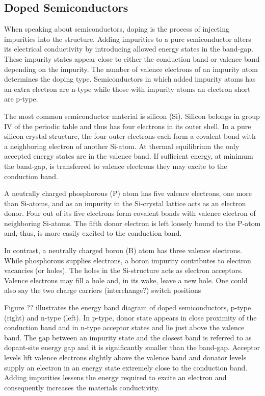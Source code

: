 \subsection{Doped Semiconductors}
When speaking about semiconductors, doping is the process of injecting impurities into the structure. Adding impurities to a pure semiconductor alters its electrical conductivity by introducing allowed energy states in the band-gap. These impurity states appear close to either the conduction band or valence band depending on the impurity. The number of valence electrons of an impurity atom determines the doping type. Semiconductors in which added impurity atoms has an extra electron are n-type while those with impurity atoms an electron short are p-type.

The most common semiconductor material is silicon (Si). Silicon belongs in group IV of the periodic table and thus has four electrons in its outer shell. In a pure silicon crystal structure, the four outer electrons each form a covalent bond with a neighboring electron of another Si-atom. At thermal equilibrium the only accepted energy states are in the valence band. If sufficient energy, at minimum the band-gap, is transferred to valence electrons they may excite to the conduction band.

A neutrally charged phosphorous (P) atom has five valence electrons, one more than Si-atoms, and as an impurity in the Si-crystal lattice acts as an electron donor. Four out of its five electrons form covalent bonds with valence electron of neighboring Si-atoms. The fifth donor electron is left loosely bound to the P-atom and, thus, is more easily excited to the conduction band.

In contrast, a neutrally charged boron (B) atom has three valence electrons. While phosphorous supplies electrons, a boron impurity contributes to electron vacancies (or holes). The holes in the Si-structure acts as electron acceptors. Valence electrons may fill a hole and, in its wake, leave a new hole. One could also say the two charge carriers (interchange?) switch positions

Figure ?? illustrates the energy band diagram of doped semiconductors, p-type (right) and n-type (left).
In p-type, donor state appears in close proximity of the conduction band and in n-type acceptor states and lie just above the valence band. The gap between an impurity state and the closest band is referred to as dopant-site energy gap and it is significantly smaller than the band-gap. Acceptor levels lift valence electrons slightly above the valence band and donator levels supply an electron in an energy state extremely close to the conduction band. Adding impurities lessens the energy required to excite an electron and consequently increases the materials conductivity.


